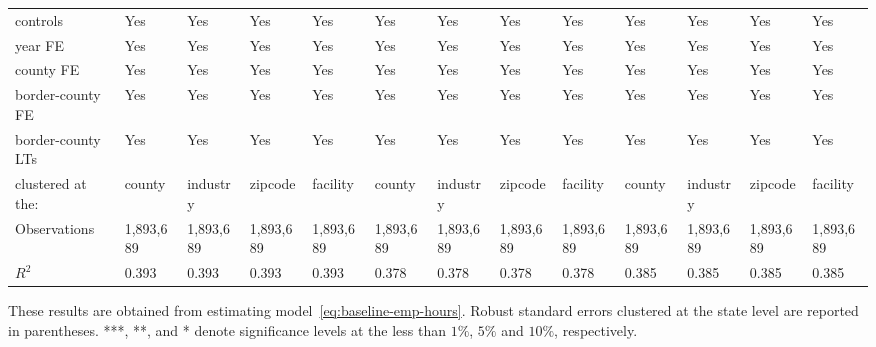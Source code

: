 \begin{table}[H]
{\begin{tabular}{@{}lllllllllllll@{}}
            controls               & Yes       & Yes       & Yes       & Yes       & Yes       & Yes       & Yes       & Yes       & Yes       & Yes       & Yes       & Yes       \\
            year FE                & Yes       & Yes       & Yes       & Yes       & Yes       & Yes       & Yes       & Yes       & Yes       & Yes       & Yes       & Yes       \\
            county FE              & Yes       & Yes       & Yes       & Yes       & Yes       & Yes       & Yes       & Yes       & Yes       & Yes       & Yes       & Yes       \\
            border-county FE       & Yes       & Yes       & Yes       & Yes       & Yes       & Yes       & Yes       & Yes       & Yes       & Yes       & Yes       & Yes       \\
            border-county LTs      & Yes       & Yes       & Yes       & Yes       & Yes       & Yes       & Yes       & Yes       & Yes       & Yes       & Yes       & Yes       \\ \midrule
            clustered at the:      & county    & industry  & zipcode   & facility  & county    & industry  & zipcode   & facility  & county    & industry  & zipcode   & facility  \\
            Observations           & 1,893,689 & 1,893,689 & 1,893,689 & 1,893,689 & 1,893,689 & 1,893,689 & 1,893,689 & 1,893,689 & 1,893,689 & 1,893,689 & 1,893,689 & 1,893,689 \\
            $R^2$                  & 0.393     & 0.393     & 0.393     & 0.393     & 0.378     & 0.378     & 0.378     & 0.378     & 0.385     & 0.385     & 0.385     & 0.385     \\ \bottomrule \bottomrule
        \end{tabular}%
    }
    \begin{minipage}{18cm}
        \vspace{0.05in}
        These results are obtained from estimating model~\ref{eq:baseline-emp-hours}. Robust standard errors clustered at the state level are reported in parentheses. ***, **, and * denote significance levels at the less than $1\%$, $5\%$ and $10\%$, respectively.
    \end{minipage}
\end{table}